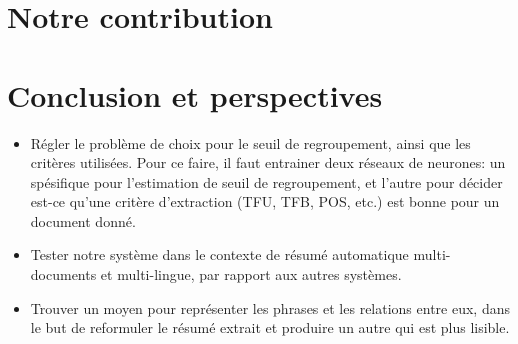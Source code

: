 \documentclass[12pt, oneside, a4paper]{book}
\begin{document}
\chapter{Notre contribution}

\chapter{Conclusion et perspectives}


\begin{itemize}

\item Régler le problème de choix pour le seuil de regroupement, ainsi que les critères utilisées. 
Pour ce faire, il faut entrainer deux réseaux de neurones: un spésifique pour l'estimation de seuil de regroupement, et l'autre pour décider est-ce qu'une critère d'extraction (TFU, TFB, POS, etc.) est bonne pour un document donné.

\item Tester notre système dans le contexte de résumé automatique multi-documents et multi-lingue, par rapport aux autres systèmes.

\item Trouver un moyen pour représenter les phrases et les relations entre eux, dans le but de reformuler le résumé extrait et produire un autre qui est plus lisible.

\end{itemize}





\end{document}
